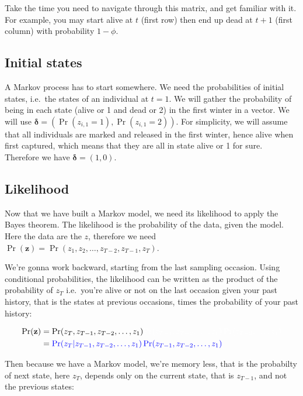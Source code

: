 \documentclass[
  12pt,
]{krantz}
\begin{document}
Take the time you need to navigate through this matrix, and get familiar with it. For example, you may start alive at \(t\) (first row) then end up dead at \(t+1\) (first column) with probability \(1-\phi\).

\hypertarget{initial-states}{%
\subsection{Initial states}\label{initial-states}}

A Markov process has to start somewhere. We need the probabilities of initial states, i.e.~the states of an individual at \(t = 1\). We will gather the probability of being in each state (alive or 1 and dead or 2) in the first winter in a vector. We will use \(\mathbf{\delta} = \left(\Pr(z_{i,1} = 1), \Pr(z_{i,1} = 2)\right)\). For simplicity, we will assume that all individuals are marked and released in the first winter, hence alive when first captured, which means that they are all in state alive or 1 for sure. Therefore we have \(\mathbf{\delta} = \left(1, 0\right)\).

\hypertarget{likelihood}{%
\subsection{Likelihood}\label{likelihood}}

Now that we have built a Markov model, we need its likelihood to apply the Bayes theorem. The likelihood is the probability of the data, given the model. Here the data are the \(z\), therefore we need \(\Pr(\mathbf{z}) = \Pr(z_1, z_2, \ldots, z_{T-2}, z_{T-1}, z_T)\).

We're gonna work backward, starting from the last sampling occasion. Using conditional probabilities, the likelihood can be written as the product of the probability of \(z_T\) i.e.~you're alive or not on the last occasion given your past history, that is the states at previous occasions, times the probability of your past history:

\begin{align*}
\Pr(\mathbf{z}) &= \Pr(z_T, z_{T-1}, z_{T-2}, \ldots, z_1) \color{white}{\Pr(z_{T-1}, z_{T-2},\ldots, z_1) \Pr(z_{T-2}, \ldots, z_1)}\\
                &= \color{blue}{\Pr(z_T | z_{T-1}, z_{T-2},\ldots, z_1) \Pr(z_{T-1}, z_{T-2},\ldots, z_1)} \\
\end{align*}

Then because we have a Markov model, we're memory less, that is the probabilty of next state, here \(z_T\), depends only on the current state, that is \(z_{T-1}\), and not the previous states:
\end{document}
